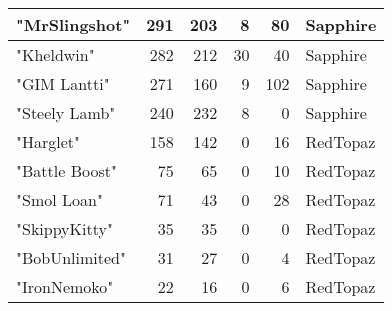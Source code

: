 \documentclass{article}
\begin{document}
\begin{table}[htbp]
\begin{tabular}{|l|r|r|r|r|l|}
"MrSlingshot" & 291 & 203 & 8 & 80 & Sapphire \\ \hline
"Kheldwin" & 282 & 212 & 30 & 40 & Sapphire \\ \hline
"GIM Lantti" & 271 & 160 & 9 & 102 & Sapphire \\ \hline
"Steely Lamb" & 240 & 232 & 8 & 0 & Sapphire \\ \hline
"Harglet" & 158 & 142 & 0 & 16 & RedTopaz \\ \hline
"Battle Boost" & 75 & 65 & 0 & 10 & RedTopaz \\ \hline
"Smol Loan" & 71 & 43 & 0 & 28 & RedTopaz \\ \hline
"SkippyKitty" & 35 & 35 & 0 & 0 & RedTopaz \\ \hline
"BobUnlimited" & 31 & 27 & 0 & 4 & RedTopaz \\ \hline
"IronNemoko" & 22 & 16 & 0 & 6 & RedTopaz \\ \hline
\end{tabular}
\end{table}
\end{document}
